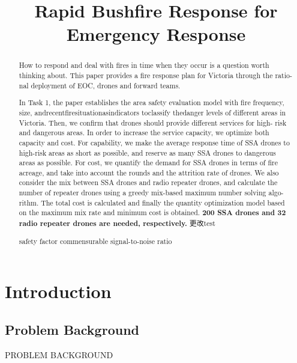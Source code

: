 \documentclass{mcmthesis}
\title{\textbf{Rapid Bushfire Response for Emergency Response}}
\begin{document}
\begin{abstract}
	\qquad How to respond and deal with fires in time when they occur is a question worth
	thinking about. This paper provides a fire response plan for Victoria through the ratio-
	nal deployment of EOC, drones and forward teams.

	In Task 1, the paper establishes the area safety evaluation model with fire frequency,
	size, andrecentfiresituationasindicators toclassify thedanger levels of different areas
	in Victoria. Then, we confirm that drones should provide different services for high-
	risk and dangerous areas. In order to increase the service capacity, we optimize both
	capacity and cost. For capability, we make the average response time of SSA drones
	to high-risk areas as short as possible, and reserve as many SSA drones to dangerous
	areas as possible. For cost, we quantify the demand for SSA drones in terms of fire
	acreage, and take into account the rounds and the attrition rate of drones. We also
	consider the mix between SSA drones and radio repeater drones, and calculate the
	number of repeater drones using a greedy mix-based maximum number solving algo-
	rithm. The total cost is calculated and finally the quantity optimization model based on
	the maximum mix rate and minimum cost is obtained.\textbf{ 200 SSA drones and 32 radio
		repeater drones are needed, respectively.}
	更改test
	\begin{keywords}
		safety factor \quad commensurable \quad signal-to-noise ratio
	\end{keywords}
\end{abstract}

\maketitle



\clearpage
\pagestyle{fancy}
\newpage
\setcounter{page}{1}

\newpage   %
\tableofcontents
\thispagestyle{empty}
\newpage

\section{Introduction}
\subsection{Problem Background}
PROBLEM BACKGROUND
\end{document}
